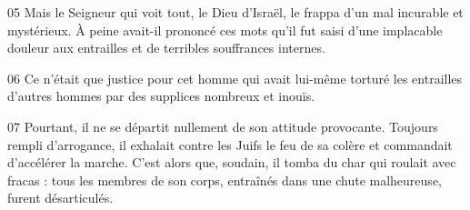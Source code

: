 
05 Mais le Seigneur qui voit tout, le Dieu d’Israël, le frappa d’un mal incurable et mystérieux. À peine avait-il prononcé ces mots qu’il fut saisi d’une implacable douleur aux entrailles et de terribles souffrances internes.

06 Ce n’était que justice pour cet homme qui avait lui-même torturé les entrailles d’autres hommes par des supplices nombreux et inouïs.

07 Pourtant, il ne se départit nullement de son attitude provocante. Toujours rempli d’arrogance, il exhalait contre les Juifs le feu de sa colère et commandait d’accélérer la marche. C’est alors que, soudain, il tomba du char qui roulait avec fracas : tous les membres de son corps, entraînés dans une chute malheureuse, furent désarticulés.
